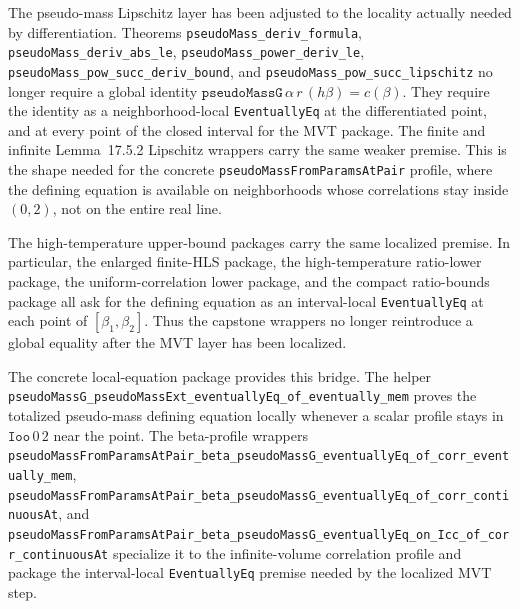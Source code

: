 \documentclass[a4paper,11pt]{article}
\begin{document}
The pseudo-mass Lipschitz layer has been adjusted to the locality actually
needed by differentiation.  Theorems
\texttt{pseudoMass\_deriv\_formula},
\texttt{pseudoMass\_deriv\_abs\_le},
\texttt{pseudoMass\_power\_deriv\_le},
\texttt{pseudoMass\_pow\_succ\_deriv\_bound}, and
\texttt{pseudoMass\_pow\_succ\_lipschitz} no longer require a global identity
\(\texttt{pseudoMassG}\,\alpha\,r\,(h\beta)=c(\beta)\).  They require the
identity as a neighborhood-local \texttt{EventuallyEq} at the differentiated
point, and at every point of the closed interval for the MVT package.  The
finite and infinite Lemma~17.5.2 Lipschitz wrappers carry the same weaker
premise.
This is the shape needed for the concrete
\texttt{pseudoMassFromParamsAtPair} profile, where the defining equation is
available on neighborhoods whose correlations stay inside \((0,2)\), not on
the entire real line.

The high-temperature upper-bound packages carry the same localized premise.
In particular, the enlarged finite-HLS package, the high-temperature
ratio-lower package, the uniform-correlation lower package, and the compact
ratio-bounds package all ask for the defining equation as an interval-local
\texttt{EventuallyEq} at each point of \([\beta_1,\beta_2]\).  Thus the
capstone wrappers no longer reintroduce a global equality after the MVT layer
has been localized.

The concrete local-equation package provides this bridge.  The helper
\texttt{pseudoMassG\_pseudoMassExt\_eventuallyEq\_of\_eventually\_mem}
proves the totalized pseudo-mass defining equation locally whenever a scalar
profile stays in \(\texttt{Ioo}\,0\,2\) near the point.  The beta-profile
wrappers
\texttt{pseudoMassFromParamsAtPair\_beta\_pseudoMassG\_eventuallyEq\_of\_corr\_eventually\_mem},
\texttt{pseudoMassFromParamsAtPair\_beta\_pseudoMassG\_eventuallyEq\_of\_corr\_continuousAt},
and
\texttt{pseudoMassFromParamsAtPair\_beta\_pseudoMassG\_eventuallyEq\_on\_Icc\_of\_corr\_continuousAt}
specialize it to the infinite-volume correlation profile and package the
interval-local \texttt{EventuallyEq} premise needed by the localized MVT
step.
\end{document}
